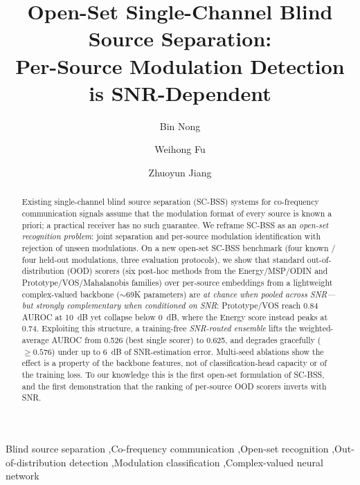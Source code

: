 \documentclass[review,12pt]{elsarticle}
\begin{document}
\begin{frontmatter}

\title{Open-Set Single-Channel Blind Source Separation:\\Per-Source Modulation Detection is SNR-Dependent}

\author[1]{Bin Nong}
\author[2]{Weihong Fu}
\author[3]{Zhuoyun Jiang}



\begin{abstract}
Existing single-channel blind source separation (SC-BSS) systems for
co-frequency communication signals assume that the modulation format of
every source is known a priori; a practical receiver has no such
guarantee. We reframe SC-BSS as an \emph{open-set recognition problem}:
joint separation and per-source modulation identification with rejection
of unseen modulations. On a new open-set SC-BSS benchmark (four known /
four held-out modulations, three evaluation protocols), we show that
standard out-of-distribution (OOD) scorers (six post-hoc methods from
the Energy/MSP/ODIN and Prototype/VOS/Mahalanobis families) over
per-source embeddings from a lightweight complex-valued backbone
($\sim$69K parameters) are \emph{at chance when pooled across
SNR---but strongly complementary when conditioned on SNR}: Prototype/VOS
reach 0.84 AUROC at \SI{10}{dB} yet collapse below \SI{0}{dB}, where the
Energy score instead peaks at 0.74. Exploiting this structure, a
training-free \emph{SNR-routed ensemble} lifts the weighted-average AUROC
from 0.526 (best single scorer) to 0.625, and degrades gracefully
($\geq 0.576$) under up to \SI{6}{dB} of SNR-estimation error. Multi-seed
ablations show the effect is a property of the backbone features, not of
classification-head capacity or of the training loss. To our knowledge
this is the first open-set formulation of SC-BSS, and the first
demonstration that the ranking of per-source OOD scorers inverts with
SNR.
\end{abstract}

\begin{keyword}
Blind source separation \sep Co-frequency communication \sep Open-set
recognition \sep Out-of-distribution detection \sep Modulation
classification \sep Complex-valued neural network
\end{keyword}

\end{frontmatter}
\end{document}
